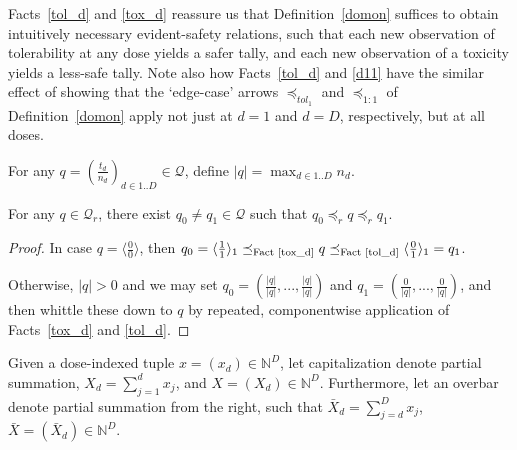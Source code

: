 \documentclass{article}
\newcommand{\N}{\mathbb{N}}
\newcommand{\Q}{\ensuremath{\mathcal{Q}}}
\begin{document}
Facts~\ref{tol_d} and \ref{tox_d} reassure us that Definition~\ref{domon} suffices to obtain intuitively necessary evident-safety relations, such that each new observation of tolerability at any dose yields a safer tally, and each new observation of a toxicity yields a less-safe tally.  Note also how Facts~\ref{tol_d} and \ref{d11} have the similar effect of showing that the `edge-case' arrows $\preceq_{tol_1}$ and $\preceq_{1:1}$ of Definition~\ref{domon} apply not just at $d=1$ and $d=D$, respectively, but at all doses.

\begin{nota}
  For any $q = (\frac{t_d}{n_d})_{d\in 1..D} \in \Q$, define $|q| = \max_{d\in 1..D} n_d$.
\end{nota}

\begin{lemma}
  For any $q \in \Q_r$, there exist $q_0 \neq q_1 \in \Q$ such that $q_0 \preceq_r q \preceq_r q_1$.
\end{lemma}
\begin{proof}
  In case $q = \langle\frac{0}{0}\rangle$, then $q_0 = \langle\frac{1}{1}\rangle_1  \preceq_\text{Fact~\ref{tox_d}} q \preceq_\text{Fact~\ref{tol_d}} \langle\frac{0}{1}\rangle_1 = q_1$.

  Otherwise, $|q| >0$ and we may set $q_0 = (\frac{|q|}{|q|},...,\frac{|q|}{|q|})$ and $q_1 = (\frac{0}{|q|},...,\frac{0}{|q|})$, and then whittle these down to $q$ by repeated, componentwise application of Facts~\ref{tox_d} and \ref{tol_d}.
\end{proof}

\begin{nota}
  Given a dose-indexed tuple $x = (x_d) \in \N^D$, let capitalization denote partial summation, $X_d = \sum_{j=1}^d x_j$, and $X = (X_d) \in \N^D$.  Furthermore, let an overbar denote partial summation from the right, such that $\bar{X}_d = \sum_{j=d}^D x_j$, $\bar{X} = (\bar{X}_d) \in \N^D$.
\end{nota}
\end{document}
